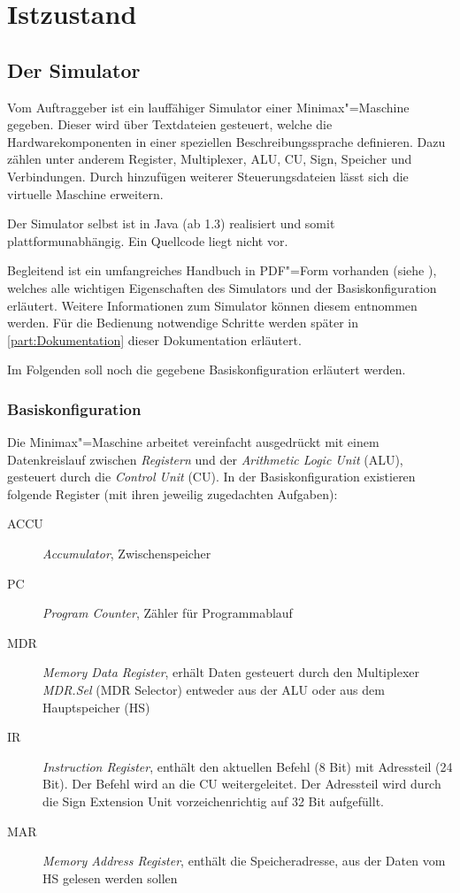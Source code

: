 \chapter{Istzustand}
\label{chapter:Pflichtenheft-Istzustand}

\section{Der Simulator}
\label{section:Pflichtenheft-Istzustand-Simulator}

Vom Auftraggeber ist ein lauffähiger Simulator einer Minimax"=Maschine gegeben. Dieser wird über Textdateien gesteuert, welche die Hardwarekomponenten in einer speziellen Beschreibungssprache definieren. Dazu zählen unter anderem Register, Multiplexer, ALU, CU, Sign, Speicher und Verbindungen. Durch hinzufügen weiterer Steuerungsdateien lässt sich die virtuelle Maschine erweitern.

Der Simulator selbst ist in Java (ab 1.3) realisiert und somit plattformunabhängig. Ein Quellcode liegt nicht vor.

Begleitend ist ein umfangreiches Handbuch in PDF"=Form vorhanden (siehe \cite{minimax-handbuch}), welches alle wichtigen Eigenschaften des Simulators und der Basiskonfiguration erläutert. Weitere Informationen zum Simulator können diesem entnommen werden. Für die Bedienung notwendige Schritte werden später in \autoref{part:Dokumentation} dieser Dokumentation erläutert.

Im Folgenden soll noch die gegebene Basiskonfiguration erläutert werden.

\subsection{Basiskonfiguration}
\label{subsection:Pflichtenheft-Istzustand-Simulator-Basiskonfiguration}

Die Minimax"=Maschine arbeitet vereinfacht ausgedrückt mit einem Datenkreislauf zwischen \emph{Registern} und der \emph{Arithmetic Logic Unit} (ALU), gesteuert durch die \emph{Control Unit} (CU). In der Basiskonfiguration existieren folgende Register (mit ihren jeweilig zugedachten Aufgaben):

\begin{description}
    \item[ACCU] \emph{Accumulator}, Zwischenspeicher
    \item[PC] \emph{Program Counter}, Zähler für Programmablauf
    \item[MDR] \emph{Memory Data Register}, erhält Daten gesteuert durch den Multiplexer \emph{MDR.Sel} (MDR Selector) entweder aus der ALU oder aus dem Hauptspeicher (HS)
    \item[IR] \emph{Instruction Register}, enthält den aktuellen Befehl (8 Bit) mit Adressteil (24 Bit). Der Befehl wird an die CU weitergeleitet. Der Adressteil wird durch die Sign Extension Unit vorzeichenrichtig auf 32 Bit aufgefüllt.
    \item[MAR] \emph{Memory Address Register}, enthält die Speicheradresse, aus der Daten vom HS gelesen werden sollen
\end{description}

